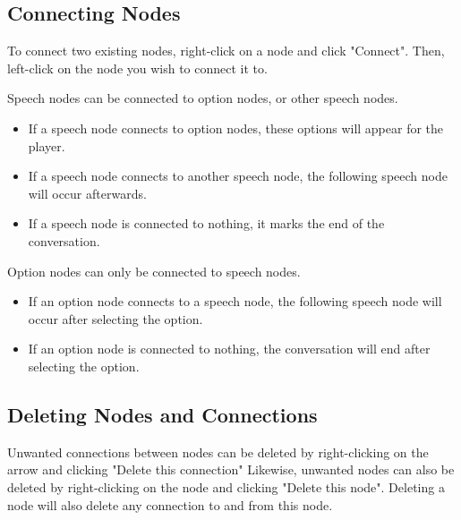 \documentclass[a4paper,12pt]{article}
\begin{document}
\subsection{Connecting Nodes}

To connect two existing nodes, right-click on a node and click "Connect". Then, left-click on the node you wish to connect it to. 

Speech nodes can be connected to option nodes, or other speech nodes. 

\begin{itemize}
\setlength\itemsep{1pt}
	\item If a speech node connects to option nodes, these options will appear for the player.
	\item If a speech node connects to another speech node, the following speech node will occur afterwards.
	\item If a speech node is connected to nothing, it marks the end of the conversation.
\end{itemize}
\bigbreak

Option nodes can only be connected to speech nodes.
\begin{itemize}
\setlength\itemsep{1pt}
	\item If an option node connects to a speech node, the following speech node will occur after selecting the option.
	\item If an option node is connected to nothing, the conversation will end after selecting the option.	
\end{itemize}

\subsection{Deleting Nodes and Connections}
Unwanted connections between nodes can be deleted by right-clicking on the arrow and clicking "Delete this connection"
\newline
Likewise, unwanted nodes can also be deleted by right-clicking on the node and clicking "Delete this node". Deleting a node will also delete any connection to and from this node.
\bigskip 
\end{document}

